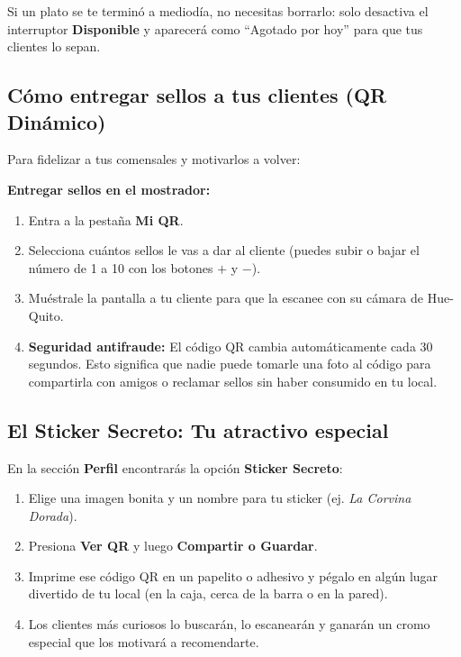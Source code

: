 \documentclass[11pt, a4paper, oneside]{article}
\begin{document}
\begin{tipbox}
Si un plato se te terminó a mediodía, no necesitas borrarlo: solo desactiva el interruptor \textbf{Disponible} y aparecerá como ``Agotado por hoy'' para que tus clientes lo sepan.
\end{tipbox}

\subsection{Cómo entregar sellos a tus clientes (QR Dinámico)}
Para fidelizar a tus comensales y motivarlos a volver:
\begin{stepbox}
\textbf{Entregar sellos en el mostrador:}
\begin{enumerate}
  \item Entra a la pestaña \textbf{Mi QR}.
  \item Selecciona cuántos sellos le vas a dar al cliente (puedes subir o bajar el número de 1 a 10 con los botones $+$ y $-$).
  \item Muéstrale la pantalla a tu cliente para que la escanee con su cámara de Hue-Quito.
  \item \textbf{Seguridad antifraude:} El código QR cambia automáticamente cada 30 segundos. Esto significa que nadie puede tomarle una foto al código para compartirla con amigos o reclamar sellos sin haber consumido en tu local.
\end{enumerate}
\end{stepbox}

\subsection{El Sticker Secreto: Tu atractivo especial}
En la sección \textbf{Perfil} encontrarás la opción \textbf{Sticker Secreto}:
\begin{enumerate}
  \item Elige una imagen bonita y un nombre para tu sticker (ej. \textit{La Corvina Dorada}).
  \item Presiona \textbf{Ver QR} y luego \textbf{Compartir o Guardar}.
  \item Imprime ese código QR en un papelito o adhesivo y pégalo en algún lugar divertido de tu local (en la caja, cerca de la barra o en la pared).
  \item Los clientes más curiosos lo buscarán, lo escanearán y ganarán un cromo especial que los motivará a recomendarte.
\end{enumerate}
\end{document}
